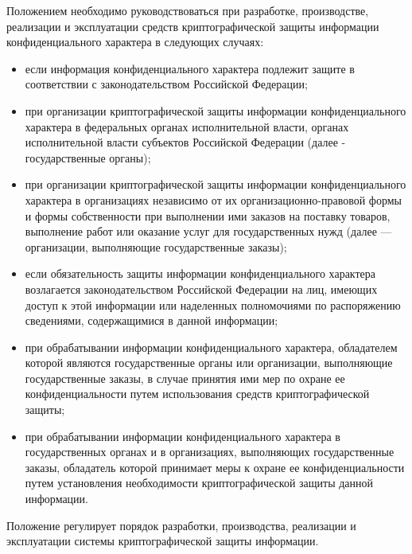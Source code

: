 \vspace{\baselineskip}
Положением необходимо руководствоваться при разработке, производстве, реализации и эксплуатации средств криптографической защиты информации конфиденциального характера в следующих случаях:
\begin{itemize}
	\item если информация конфиденциального характера подлежит защите в соответствии с законодательством Российской Федерации;
	\item при организации криптографической защиты информации конфиденциального характера в федеральных органах исполнительной власти, органах исполнительной власти субъектов Российской Федерации (далее - государственные органы);
	\item при организации криптографической защиты информации конфиденциального характера в организациях независимо от их организационно-правовой формы и формы собственности при выполнении ими заказов на поставку товаров, выполнение работ или оказание услуг для государственных нужд (далее --- организации, выполняющие государственные заказы);
	\item если обязательность защиты информации конфиденциального характера возлагается законодательством Российской Федерации на лиц, имеющих доступ к этой информации или наделенных полномочиями по распоряжению сведениями, содержащимися в данной информации;
	\item при обрабатывании информации конфиденциального характера, обладателем которой являются государственные органы или организации, выполняющие государственные заказы, в случае принятия ими мер по охране ее конфиденциальности путем использования средств криптографической защиты;
	\item при обрабатывании информации конфиденциального характера в государственных органах и в организациях, выполняющих государственные заказы, обладатель которой принимает меры к охране ее конфиденциальности путем установления необходимости криптографической защиты данной информации.
\end{itemize}

Положение регулирует порядок разработки, производства, реализации и эксплуатации системы криптографической защиты информации.
